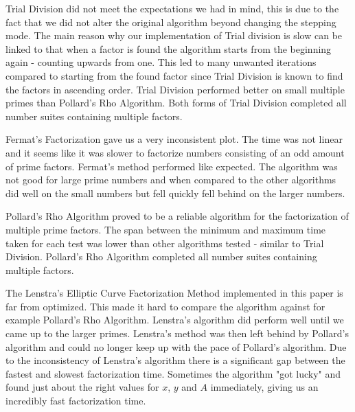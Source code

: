 Trial Division did not meet the expectations we had in mind, this is due to the fact that we did not alter the original algorithm beyond changing the stepping mode. The main reason why our implementation of Trial division is slow can be linked to that when a factor is found the algorithm starts from the beginning again - counting upwards from one. This led to many unwanted iterations compared to starting from the found factor since Trial Division is known to find the factors in ascending order. Trial Division performed better on small multiple primes than Pollard's Rho Algorithm. Both forms of Trial Division completed all number suites containing multiple factors.

Fermat's Factorization gave us a very inconsistent plot. The time was not linear and it seems like it was slower to factorize numbers consisting of an odd amount of prime factors. Fermat's method performed like expected. The algorithm was not good for large prime numbers and when compared to the other algorithms did well on the small numbers but fell quickly fell behind on the larger numbers.

Pollard's Rho Algorithm proved to be a reliable algorithm for the factorization of multiple prime factors. The span between the minimum and maximum time taken for each test was lower than other algorithms tested - similar to Trial Division. Pollard's Rho Algorithm completed all number suites containing multiple factors.

The Lenstra's Elliptic Curve Factorization Method implemented in this paper is far from optimized. This made it hard to compare the algorithm against for example Pollard's Rho Algorithm. Lenstra's algorithm did perform well until we came up to the larger primes. Lenstra's method was then left behind by Pollard's algorithm and could no longer keep up with the pace of Pollard's algorithm. Due to the inconsistency of Lenstra's algorithm there is a significant gap between the fastest and slowest factorization time. Sometimes the algorithm "got lucky" and found just about the right values for $x$, $y$ and $A$ immediately, giving us an incredibly fast factorization time.